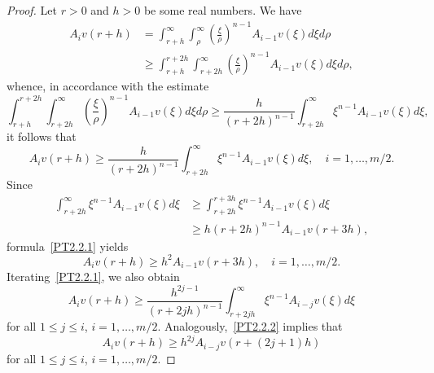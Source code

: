 \documentclass[10pt,a4paper]{amsart}
\begin{document}
\begin{proof}
Let $r > 0$ and $h > 0$ be some real numbers.
We have
\begin{align*}
	A_i v (r + h)
	&
	=
	\int_{r + h}^\infty
	\int_\rho^\infty
	\left(
		\frac{\xi}{\rho}
	\right)^{n - 1}
	A_{i-1} v (\xi)
	d\xi
	d\rho
	\\
	&
	\ge
	\int_{r + h}^{r + 2 h}
	\int_{r + 2 h}^\infty
	\left(
		\frac{\xi}{\rho}
	\right)^{n - 1}
	A_{i-1} v (\xi)
	d\xi
	d\rho,
\end{align*}
whence, in accordance with the estimate
$$
	\int_{r + h}^{r + 2 h}
	\int_{r + 2 h}^\infty
	\left(
		\frac{\xi}{\rho}
	\right)^{n - 1}
	A_{i-1} v (\xi)
	d\xi
	d\rho
	\ge
	\frac{
		h
	}{
		(r + 2 h)^{n - 1}
	}
	\int_{r + 2 h}^\infty
	\xi^{n - 1}
	A_{i-1} v (\xi)
	d\xi,
$$
it follows that
\begin{equation}
	A_i v (r + h)
	\ge
	\frac{
		h
	}{
		(r + 2 h)^{n - 1}
	}
	\int_{r + 2 h}^\infty
	\xi^{n - 1}
	A_{i-1} v (\xi)
	d\xi,
	\quad
	i = 1, \ldots, m / 2.
	\label{PT2.2.1}
\end{equation}
Since
\begin{align*}
	\int_{r + 2 h}^\infty
	\xi^{n - 1}
	A_{i-1} v (\xi)
	d\xi
	&
	{}
	\ge
	\int_{r + 2 h}^{r + 3 h}
	\xi^{n - 1}
	A_{i-1} v (\xi)
	d\xi
	\\
	&
	{}
	\ge
	h
	(r + 2 h)^{n - 1}
	A_{i-1} v (r + 3 h),
\end{align*}
formula~\eqref{PT2.2.1} yields
\begin{equation}
	A_i v (r + h)
	\ge
	h^2
	A_{i - 1} v (r + 3 h),
	\quad
	i = 1, \ldots, m / 2.
	\label{PT2.2.2}
\end{equation}
Iterating~\eqref{PT2.2.1}, we also obtain
\begin{equation}
	A_i v (r + h)
	\ge
	\frac{
		h^{2 j - 1}
	}{
		(r + 2 j h)^{n - 1}
	}
	\int_{r + 2 j h}^\infty
	\xi^{n - 1}
	A_{i - j} v (\xi)
	d\xi
	\label{PT2.2.3}
\end{equation}
for all $1 \le j \le i$, $	i = 1, \ldots, m / 2$.
Analogously,~\eqref{PT2.2.2} implies that
\begin{equation}
	A_i v (r + h)
	\ge
	h^{2 j}
	A_{i - j} v (r + (2j + 1) h)
	\label{PT2.2.4}
\end{equation}
for all $1 \le j \le i$, $	i = 1, \ldots, m / 2$.


\end{proof}
\end{document}
